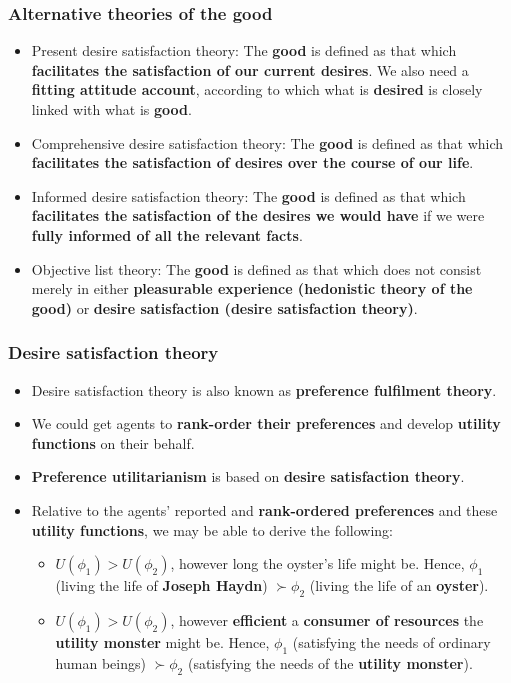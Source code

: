 \documentclass[11pt]{article}
\begin{document}
 \newpage
\subsubsection{Alternative theories of the good}
\label{sec:org817c508}
\begin{itemize}
\item Present desire satisfaction theory:
The \textbf{good} is defined as that which \textbf{facilitates the satisfaction of our current desires}. We also need a \textbf{fitting attitude account}, according to which what is \textbf{desired} is closely linked with what is \textbf{good}.
\item Comprehensive desire satisfaction theory:
The \textbf{good} is defined as that which \textbf{facilitates the satisfaction of desires over the course of our life}.
\item Informed desire satisfaction theory:
The \textbf{good} is defined as that which \textbf{facilitates the satisfaction of the desires we would have} if we were \textbf{fully informed of all the relevant facts}.
\item Objective list theory:
The \textbf{good} is defined as that which does not consist merely in either \textbf{pleasurable experience (hedonistic theory of the good)} or \textbf{desire satisfaction (desire satisfaction theory)}.
\end{itemize}
\subsubsection{Desire satisfaction theory}
\label{sec:org0e15ad7}
\begin{itemize}
\item Desire satisfaction theory is also known as \textbf{preference fulfilment theory}.
\item We could get agents to \textbf{rank-order their preferences} and develop \textbf{utility functions} on their behalf.
\item \textbf{Preference utilitarianism} is based on \textbf{desire satisfaction theory}.
\item Relative to the agents' reported and \textbf{rank-ordered preferences} and these \textbf{utility functions}, we may be able to derive the following:
\begin{itemize}
\item \(U (\phi_1) > U (\phi_2)\), however long the oyster's life might be. Hence, \(\phi_1\) (living the life of \textbf{Joseph Haydn}) \(\succ \phi_2\) (living the life of an \textbf{oyster}).
\item \(U (\phi_1) > U (\phi_2)\), however \textbf{efficient} a \textbf{consumer of resources} the \textbf{utility monster} might be.
Hence, \(\phi_1\) (satisfying the needs of ordinary human beings) \(\succ \phi_2\) (satisfying the needs of the \textbf{utility monster}).
\end{itemize}
\end{itemize}
\end{document}
